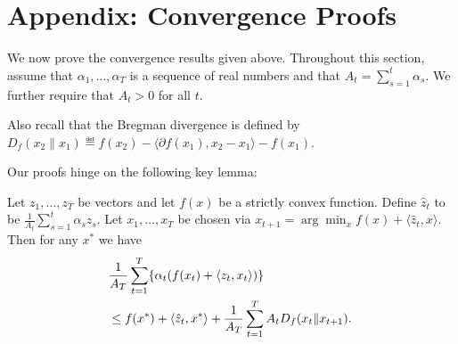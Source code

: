 \documentclass{article} %
\begin{document}



\newpage 

\section*{Appendix: Convergence Proofs} 
\label{sec:proofs}

We now prove the convergence results given above. Throughout this section, assume that $\alpha_1,\ldots,\alpha_T$ is 
a sequence of real numbers and that $A_t = \sum_{s=1}^t \alpha_s$. 
We further require that $A_t > 0$ for all $t$.

Also recall that the Bregman divergence is defined by 
$D_f(x_2 \| x_1) \eqdef f(x_2) - \langle \partial f(x_1), x_2-x_1 \rangle - f(x_1)$.

Our proofs hinge on the following key lemma:

\begin{lemma}
\label{lem:bregman}
Let $z_1,\ldots,z_T$ be vectors and let $f(x)$ be a strictly convex 
function. Define $\hat{z}_t$ to be $\frac{1}{A_t} \sum_{s=1}^t \alpha_s z_s$.
Let $x_1,\ldots,x_T$ be chosen via $x_{t+1} = \arg\min_{x} f(x) + \langle \hat{z}_t, x\rangle$. 
Then for any $x^*$ we have
\begin{align*}
\lefteqn{\frac{1}{A_T} \sum_{t=1}^T \{\alpha_t(f(x_t) + \langle z_t, x_t \rangle)\}} \\
\phantom{+} &\leq f(x^*) + \langle \hat{z}_t, x^* \rangle + \frac{1}{A_T} \sum_{t=1}^T A_t D_{f}(x_t \| x_{t+1}). 
\end{align*}
\end{lemma}
\end{document}
